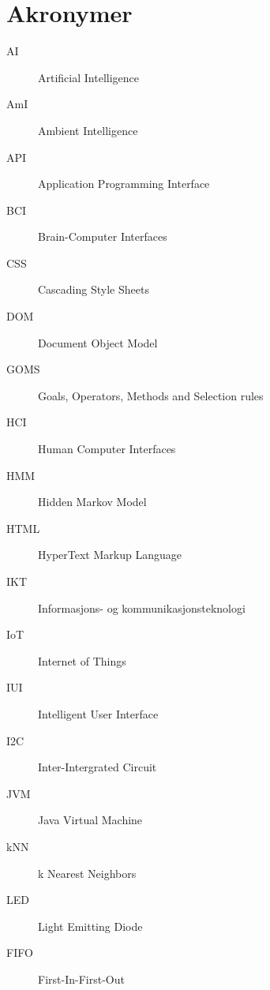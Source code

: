 \section{Akronymer}
\label{akronymer}
\begin{description}
\item[AI] Artificial Intelligence
\item[AmI] Ambient Intelligence
\item[API] Application Programming Interface
\item[BCI] Brain-Computer Interfaces
\item[CSS] Cascading Style Sheets
\item[DOM] Document Object Model
\item[GOMS] Goals, Operators, Methods and Selection rules
\item[HCI] Human Computer Interfaces
\item[HMM] Hidden Markov Model
\item[HTML] HyperText Markup Language
\item[IKT] Informasjons- og kommunikasjonsteknologi
\item[IoT] Internet of Things
\item[IUI] Intelligent User Interface
\item[I2C] Inter-Intergrated Circuit
\item[JVM] Java Virtual Machine
\item[kNN] k Nearest Neighbors
\item[LED] Light Emitting Diode
\item[FIFO] First-In-First-Out
\end{description}
